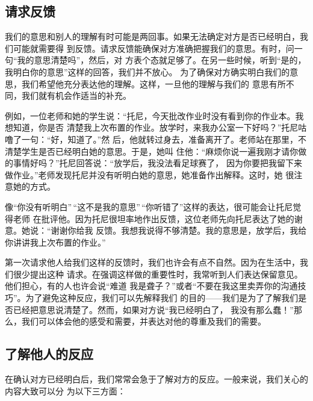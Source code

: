 \documentclass{ctexart}
\begin{document}
\subsection{请求反馈}
我们的意思和别人的理解有时可能是两回事。如果无法确定对方是否已经明白，我们可能就需要得
到反馈。请求反馈能确保对方准确把握我们的意思。有时，问一句``我的意思清楚吗''，然后，对
方表个态就足够了。在另一些时候，听到``是的，我明白你的意思''这样的回答，我们并不放心。
为了确保对方确实明白我们的意思，我们希望他充分表达他的理解。这样，一旦他的理解与我们的
意思有所不同，我们就有机会作适当的补充。

例如，一位老师和她的学生说：``托尼，今天批改作业时没有看到你的作业本。我想知道，你是否
清楚我上次布置的作业。放学时，来我办公室一下好吗？''托尼咕噜了一句：``好，知道了。''然
后，他就转过身去，准备离开了。老师站在那里，不清楚学生是否已经明白她的意思。于是，她叫
住他：``麻烦你说一遍我刚才请你做的事情好吗？''托尼回答说：``放学后，我没法看足球赛了，
因为你要把我留下来做作业。''老师发现托尼并没有听明白她的意思，她准备作出解释。这时，她
很注意她的方式。

像``你没有听明白''\,``这不是我的意思''\,``你听错了''这样的表达，很可能会让托尼觉得老师
在批评他。因为托尼很坦率地作出反馈，这位老师先向托尼表达了她的谢意。她说：``谢谢你给我
反馈。我想我说得不够清楚。我的意思是，放学后，我给你讲讲我上次布置的作业。''

第一次请求他人给我们这样的反馈时，我们也许会有点不自然。因为在生活中，我们很少提出这种
请求。在强调这样做的重要性时，我常听到人们表达保留意见。他们担心，有的人也许会说``难道
我是聋子？''或者``不要在我这里卖弄你的沟通技巧''。为了避免这种反应，我们可以先解释我们
的目的------我们是为了了解我们是否已经把意思说清楚了。然而，如果对方说``我已经明白了，
我没有那么蠢！''那么，我们可以体会他的感受和需要，并表达对他的尊重及我们的需要。


\subsection{了解他人的反应}

在确认对方已经明白后，我们常常会急于了解对方的反应。一般来说，我们关心的内容大致可以分
为以下三方面：
\end{document}

